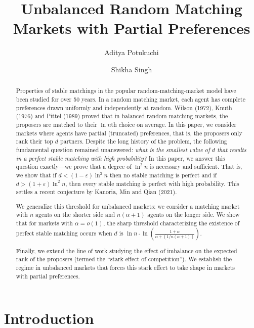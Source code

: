 \documentclass[11pt]{amsart}
\title{Unbalanced Random Matching Markets with Partial Preferences}
\author{Aditya Potukuchi}
\author{Shikha Singh}
\renewcommand{\epsilon}{\varepsilon}
\begin{document}
\maketitle


\begin{abstract}

Properties of stable matchings in the popular random-matching-market model have been studied for over 50 years. In a random matching market, each agent has complete preferences drawn uniformly and independently at random.  Wilson (1972), Knuth (1976) and Pittel (1989) proved that in balanced random matching markets, the proposers are matched to  their $\ln n$th choice on average.  In this paper, we consider markets where agents have partial (truncated) preferences, that is, the proposers only rank their top $d$ partners. Despite the long history of the problem, the following fundamental question remained unanswered: \emph{what is the smallest value of $d$ that results in a perfect stable matching with high probability?}  In this paper, we answer this question exactly---we prove that a degree of $\ln^2 n$ is necessary and sufficient.  That is, we show that if $d < (1-\epsilon) \ln^2 n$ then no stable matching is perfect and if $d > (1+ \epsilon) \ln^2 n$, then every stable matching is perfect with high probability. This settles a recent conjecture by Kanoria, Min and Qian (2021).



We generalize this threshold for unbalanced markets: we consider a matching market with $n$ agents on the shorter side and $n(\alpha+1)$ agents on the longer side. We show that for markets with $\alpha =o(1)$, the sharp threshold characterizing the existence of perfect stable matching occurs when $d$ is $\ln n \cdot \ln \left(\frac{1 + \alpha}{\alpha + (1/n(\alpha+1))} \right)$.  
 

Finally, we extend the line of work studying the effect of imbalance on the expected rank of the proposers (termed the ``stark effect of competition''). We establish the regime in unbalanced markets that forces this stark effect to take shape in markets with partial preferences.

\end{abstract}
 \section{Introduction}\label{sec:intro}
\end{document}
